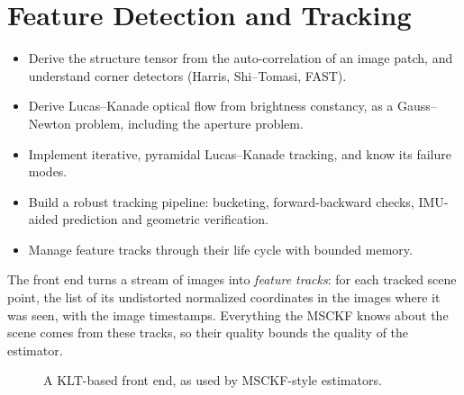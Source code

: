 \chapter{Feature Detection and Tracking}
\label{ch:frontend}

\begin{objectives}
\begin{itemize}
  \item Derive the structure tensor from the auto-correlation of an image patch, and understand corner detectors (Harris, Shi--Tomasi, FAST).
  \item Derive Lucas--Kanade optical flow from brightness constancy, as a Gauss--Newton problem, including the aperture problem.
  \item Implement iterative, pyramidal Lucas--Kanade tracking, and know its failure modes.
  \item Build a robust tracking pipeline: bucketing, forward-backward checks, IMU-aided prediction and geometric verification.
  \item Manage feature tracks through their life cycle with bounded memory.
\end{itemize}
\end{objectives}

The front end turns a stream of images into \emph{feature tracks}: for each tracked scene point, the list of its undistorted normalized coordinates in the images
where it was seen, with the image timestamps. Everything the MSCKF knows about the scene comes from these tracks, so their quality bounds the quality of the
estimator.

\begin{figure}[h]
\centering
{}
\caption{A KLT-based front end, as used by MSCKF-style estimators.}
\label{fig:frontend-pipeline}
\end{figure}

